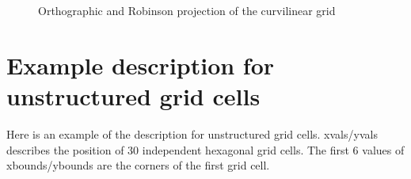 \begin{figure}[b]
{}
\caption[curvgrid]{Orthographic and Robinson projection of the curvilinear grid}
\end{figure}

\newpage
\section{Example description for unstructured grid cells}
Here is an example of the {\CDO} description for unstructured grid cells.
xvals/yvals describes the position of 30 independent hexagonal grid cells.
The first 6 values of xbounds/ybounds are the corners of the first grid cell.
